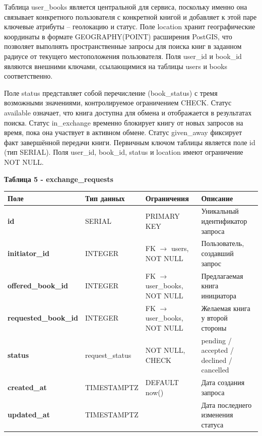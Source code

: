 \documentclass[14pt,a4paper]{extarticle}
\begin{document}
Таблица user\_books является центральной для сервиса, поскольку именно
она связывает конкретного пользователя с конкретной книгой и добавляет к
этой паре ключевые атрибуты -- геолокацию и статус. Поле location хранит
географические координаты в формате GEOGRAPHY(POINT) расширения PostGIS,
что позволяет выполнять пространственные запросы для поиска книг в
заданном радиусе от текущего местоположения пользователя. Поля user\_id
и book\_id являются внешними ключами, ссылающимися на таблицы users и
books соответственно.

Поле status представляет собой перечисление (book\_status) с тремя
возможными значениями, контролируемое ограничением CHECK. Статус
available означает, что книга доступна для обмена и отображается в
результатах поиска. Статус in\_exchange временно блокирует книгу от
новых запросов на время, пока она участвует в активном обмене. Статус
given\_away фиксирует факт завершённой передачи книги. Первичным ключом
таблицы является поле id (тип SERIAL). Поля user\_id, book\_id, status и
location имеют ограничение NOT NULL.

\textbf{Таблица 5 - exchange\_requests}


\begin{longtable}[]{@{}
  >{\centering\arraybackslash}p{}
  >{\centering\arraybackslash}p{}
  >{\centering\arraybackslash}p{}
  >{\centering\arraybackslash}p{}@{}}
\toprule\noalign{}
\begin{minipage}[b]{\linewidth}\centering
\textbf{Поле}
\end{minipage} & \begin{minipage}[b]{\linewidth}\centering
\textbf{Тип данных}
\end{minipage} & \begin{minipage}[b]{\linewidth}\centering
\textbf{Ограничения}
\end{minipage} & \begin{minipage}[b]{\linewidth}\centering
\textbf{Описание}
\end{minipage} \\
\midrule\noalign{}
\endhead
\bottomrule\noalign{}
\endlastfoot
\textbf{id} & SERIAL & PRIMARY KEY & Уникальный идентификатор запроса \\
\textbf{initiator\_id} & INTEGER & FK $\rightarrow$ users, NOT NULL & Пользователь,
создавший запрос \\
\textbf{offered\_book\_id} & INTEGER & FK $\rightarrow$ user\_books, NOT NULL &
Предлагаемая книга инициатора \\
\textbf{requested\_book\_id} & INTEGER & FK $\rightarrow$ user\_books, NOT NULL &
Желаемая книга у второй стороны \\
\textbf{status} & request\_status & NOT NULL, CHECK & pending / accepted
/ declined / cancelled \\
\textbf{created\_at} & TIMESTAMPTZ & DEFAULT now() & Дата создания
запроса \\
\textbf{updated\_at} & TIMESTAMPTZ & & Дата последнего изменения
статуса \\
\end{longtable}
\end{document}

